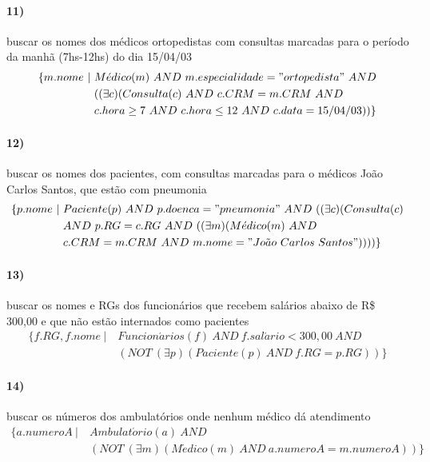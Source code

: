 \documentclass[12pt]{article}
\begin{document}
\paragraph{11)} buscar os nomes dos médicos ortopedistas com consultas marcadas para o período da manhã (7hs-12hs) do dia 15/04/03
\begin{align*}
    \{ m.nome\ |\ & M\acute{e}dico(m)\ AND\ m.especialidade = "ortopedista"\ AND\\
    & ((\exists c)(Consulta(c)\ AND\ c.CRM = m.CRM\ AND\\
    & c.hora \geq 7\ AND\ c.hora \leq 12\ AND\ c.data = 15/04/03 )) \}
\end{align*}

\paragraph{12)} buscar os nomes dos pacientes, com consultas marcadas para o médicos João Carlos Santos, que estão com pneumonia
\begin{align*}
    \{ p.nome\ |\ & Paciente(p)\ AND\ p.doenca = "pneumonia"\ AND\ ((\exists c)(Consulta(c)\\
    & AND\ p.RG = c.RG\ AND\ ((\exists m)(M\acute{e}dico(m)\ AND\\
    & c.CRM = m.CRM\ AND\ m.nome = "Jo\tilde{a}o\ Carlos\ Santos")))) \}
\end{align*}

\paragraph{13)} buscar os nomes e RGs dos funcionários que recebem salários abaixo de R\$ 300,00 e que não estão internados como pacientes
\begin{align*}
    \{ f.RG, f.nome\ |\ & Funcion\acute{a}rios(f)\ AND\ f.sal\acute{a}rio < 300,00\ AND\\
    & (NOT\ (\exists p)(Paciente(p)\ AND\ f.RG = p.RG)) \}
\end{align*}

\paragraph{14)} buscar os números dos ambulatórios onde nenhum médico dá atendimento
\begin{align*}
    \{ a.numeroA\ |\ & Ambulat\acute{o}rio(a)\ AND\\
    & (NOT\ (\exists m)(M\acute{e}dico(m)\ AND\ a.numeroA = m.numeroA)) \}
\end{align*}
\end{document}
